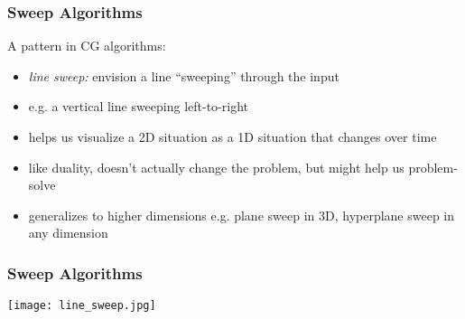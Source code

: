 \documentclass{beamer}
\begin{document}
\begin{frame} \frametitle{Sweep Algorithms}
A pattern in CG algorithms:
\begin{itemize}
  \item \emph{line sweep:} envision a line ``sweeping'' through the input
  \item e.g. a vertical line sweeping left-to-right
  \item helps us visualize a 2D situation as a 1D situation that changes over
    time
  \item like duality, doesn't actually change the problem, but might help us
    problem-solve
  \item generalizes to higher dimensions e.g. plane sweep in 3D, hyperplane sweep
    in any dimension
\end{itemize}
\end{frame}

\begin{frame} \frametitle{Sweep Algorithms}
  \begin{center}
    \texttt{[image: line\_sweep.jpg]}
  \end{center}
\end{frame}
\end{document}
